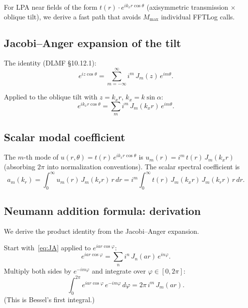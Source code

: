 \documentclass[11pt,a4paper]{article}
\begin{document}
For LPA near fields of the form
$t(r)\cdot e^{ik_x r\cos\theta}$ (axisymmetric transmission $\times$ oblique tilt),
we derive a fast path that avoids $M_{\max}$ individual FFTLog calls.

\subsection{Jacobi--Anger expansion of the tilt}

The identity (DLMF \S10.12.1):
\begin{equation}\label{eq:JA}
  e^{iz\cos\theta} = \sum_{m=-\infty}^{\infty} i^m\,J_m(z)\,e^{im\theta}.
\end{equation}

Applied to the oblique tilt with $z = k_x r$, $k_x = k\sin\alpha$:
\begin{equation}
  e^{ik_x r\cos\theta} = \sum_m i^m\,J_m(k_x r)\,e^{im\theta}.
\end{equation}

\subsection{Scalar modal coefficient}

The $m$-th mode of $u(r,\theta) = t(r)\,e^{ik_x r\cos\theta}$ is
$u_m(r) = i^m\,t(r)\,J_m(k_x r)$
(absorbing $2\pi$ into normalization conventions).  The scalar spectral coefficient is
\begin{equation}\label{eq:am}
  a_m(k_r) = \int_0^\infty u_m(r)\,J_m(k_r r)\,r\,dr
  = i^m\int_0^\infty t(r)\,J_m(k_x r)\,J_m(k_r r)\,r\,dr.
\end{equation}

\subsection{Neumann addition formula: derivation}

We derive the product identity from the Jacobi--Anger expansion.

Start with~\eqref{eq:JA} applied to $e^{ia r\cos\varphi}$:
\begin{equation}
  e^{ia r\cos\varphi} = \sum_n i^n\,J_n(ar)\,e^{in\varphi}.
\end{equation}
Multiply both sides by $e^{-im\varphi}$ and integrate over $\varphi\in[0,2\pi]$:
\begin{equation}\label{eq:JA_proj}
  \int_0^{2\pi} e^{iar\cos\varphi}\,e^{-im\varphi}\,d\varphi
  = 2\pi\,i^m\,J_m(ar).
\end{equation}
(This is Bessel's first integral.)
\end{document}
